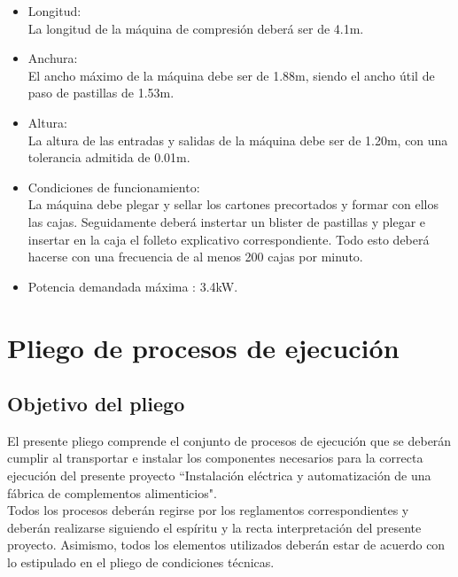 		\begin{itemize}
			\item{Longitud:}\\
			La longitud de la máquina de compresión deberá ser de 4.1m. 

			\item{Anchura:}\\
			El ancho máximo de la máquina debe ser de 1.88m, siendo el ancho útil de paso de pastillas de 1.53m.
			
			\item{Altura:}\\
			La altura de las entradas y salidas de la máquina debe ser de 1.20m, con una tolerancia admitida de 0.01m.
			
			
			\item{Condiciones de funcionamiento: }\\
			La máquina debe plegar y sellar los cartones precortados y formar con ellos las cajas. Seguidamente deberá instertar un blister de pastillas y plegar e insertar en la caja el folleto explicativo correspondiente. Todo esto deberá hacerse con una frecuencia de al menos 200 cajas por minuto.
			

			\item{Potencia demandada máxima :} 3.4kW.
		
		\end{itemize}



\newpage\section {Pliego de procesos de ejecución}

\subsection{Objetivo del pliego}	
El presente pliego comprende el conjunto de procesos de ejecución que se deberán cumplir al transportar e instalar los componentes necesarios para la correcta ejecución del presente proyecto ``Instalación eléctrica y automatización de una fábrica de complementos alimenticios".
\\
Todos los procesos deberán regirse por los reglamentos correspondientes y deberán realizarse siguiendo el espíritu y la recta interpretación del presente proyecto. Asimismo, todos los elementos utilizados deberán estar de acuerdo con lo estipulado en el pliego de condiciones técnicas.

